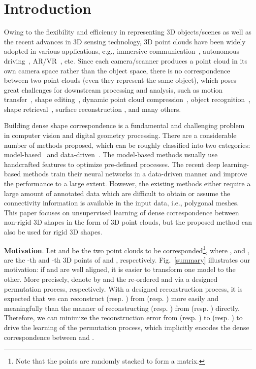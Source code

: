\documentclass[final]{cvpr}
\begin{document}
\section{Introduction}

Owing to the flexibility and efficiency in representing 3D objects/scenes as well as the recent advances in 3D sensing technology, 3D point clouds have been widely adopted in various applications,
e.g., immersive communication~\cite{apostolopoulos2012road}, autonomous driving~\cite{raviteja2020introduction}, AR/VR~\cite{silva2003introduction}, etc. Since each camera/scanner produces a point cloud in its own camera space 
rather than the object space, there is no correspondence between two point clouds (even they represent the same object), which poses great challenges for downstream processing and analysis, such as 
motion transfer~\cite{sun2020human},  shape editing~\cite{liu2019deep}, dynamic point cloud compression~\cite{huang20193d}, object recognition~\cite{arnold2019survey}, shape retrieval~\cite{gezawa2020review}, 
surface reconstruction \cite{bronstein2017geometric}, and many others.



Building dense shape correspondence is a fundamental and challenging problem in computer vision and digital geometry processing. There are a considerable number of methods proposed, which   
can be roughly classified into two categories: model-based~\cite{bronstein2006generalized,huang2008non,tevs2011intrinsic,ovsjanikov2012functional} and data-driven~\cite{litany2017deep,donati2020deep,corman2014supervised}.
The model-based methods usually use handcrafted features to optimize pre-defined processes. The recent deep learning-based methods train their neural networks in a data-driven manner and improve the performance to a large extent. However, the existing methods either require a large amount of annotated data which are difficult to obtain or assume the connectivity information is available in the input data, i.e., polygonal meshes. This paper focuses on unsupervised learning of dense correspondence between non-rigid 3D shapes in the form of 3D point clouds, but the proposed method can also be used for rigid 3D shapes. 

\textbf{Motivation}.   Let  and  be the two point clouds to be corresponded\footnote{Note that the points are randomly stacked to form a matrix.}, where 
,  and ,  are the -th and -th 3D points of  and , respectively. 
Fig.~\ref{summary} illustrates our motivation: if  and  are well aligned, it is easier to transform one model to the other. More precisely, denote by  and  the re-ordered  and  via a designed permutation process, respectively.  
With a designed reconstruction process, it is expected that we can reconstruct  (resp. ) from  (resp. ) more easily and meaningfully than the manner of reconstructing  (resp. ) from  (resp. ) directly. 
Therefore, we can minimize the reconstruction error from  (resp. ) to   (resp. ) to drive the learning of the permutation process, which implicitly encodes the dense correspondence between  and . 
\end{document}
